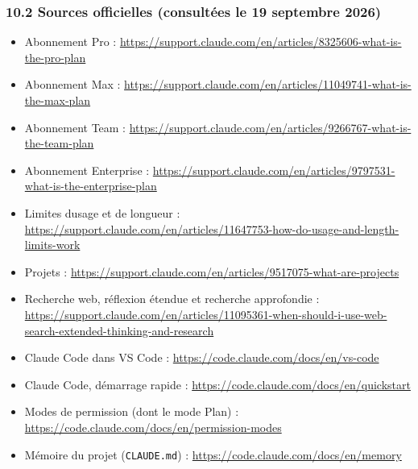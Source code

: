 \documentclass[
  french,
  11pt,
  a4paper,
]{article}
\providecommand{\tightlist}{%
  \setlength{\itemsep}{0pt}\setlength{\parskip}{0pt}}
\begin{document}
\subsubsection{10.2 Sources officielles (consultées le 19 septembre
2026)}\label{102-sources-officielles-consultuxe9es-le-19-septembre-2026}

\begin{itemize}
\tightlist
\item
  Abonnement Pro :
  \url{https://support.claude.com/en/articles/8325606-what-is-the-pro-plan}
\item
  Abonnement Max :
  \url{https://support.claude.com/en/articles/11049741-what-is-the-max-plan}
\item
  Abonnement Team :
  \url{https://support.claude.com/en/articles/9266767-what-is-the-team-plan}
\item
  Abonnement Enterprise :
  \url{https://support.claude.com/en/articles/9797531-what-is-the-enterprise-plan}
\item
  Limites d\textquotesingle usage et de longueur :
  \url{https://support.claude.com/en/articles/11647753-how-do-usage-and-length-limits-work}
\item
  Projets :
  \url{https://support.claude.com/en/articles/9517075-what-are-projects}
\item
  Recherche web, réflexion étendue et recherche approfondie :
  \url{https://support.claude.com/en/articles/11095361-when-should-i-use-web-search-extended-thinking-and-research}
\item
  Claude Code dans VS Code :
  \url{https://code.claude.com/docs/en/vs-code}
\item
  Claude Code, démarrage rapide :
  \url{https://code.claude.com/docs/en/quickstart}
\item
  Modes de permission (dont le mode Plan) :
  \url{https://code.claude.com/docs/en/permission-modes}
\item
  Mémoire du projet (\texttt{CLAUDE.md}) :
  \url{https://code.claude.com/docs/en/memory}
\end{itemize}
\end{document}
